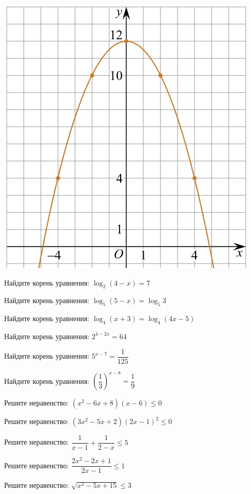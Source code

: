 \begin{homework}[number=3]
\begin{listofex}
\begin{minipage}[c]{0.12\textwidth}
			\includegraphics[align=t, width=\textwidth]{../../pics/KUZNETSOVM6H1-1.jpg}
		\end{minipage}
		\item Найдите корень уравнения: \( \log_2(4-x)=7 \)
		\item Найдите корень уравнения: \( \log_5(5-x)=\log_5{3} \)
		\item Найдите корень уравнения: \( \log_4(x+3)=\log_4(4x-5) \)
		\item Найдите корень уравнения: \( 2^{4-2x}=64 \)
		\item Найдите корень уравнения: \( 5^{x-7}=\dfrac{1}{125} \)
		\item Найдите корень уравнения: \( \left( \dfrac{1}{3} \right)^{x-8} = \dfrac{1}{9} \)
		\item Решите неравенство: \( (x^2-6x+8)(x-6) \le 0 \)
		\item Решите неравенство: \( (3x^2-5x+2)(2x-1)^2 \le 0 \)
		\item Решите неравенство: \( \dfrac{1}{x-1}+\dfrac{1}{2-x} \le 5 \)
		\item Решите неравенство: \( \dfrac{2x^2-2x+1}{2x-1} \le 1 \)
		\item Решите неравенство: \( \sqrt{x^2-5x+15} \le 3 \)
	\end{listofex}
\end{homework}

